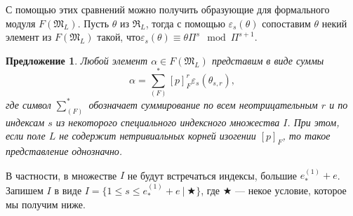 \documentclass[a4paper]{article}
\newcommand{\ML}{\mathfrak{M}_L}
\newcommand{\RL}{\mathfrak{R}_L}
\newcommand{\Leq}{\leqslant}
\newtheorem{proposition}{Предложение}
\begin{document}
С помощью этих сравнений можно получить образующие для формального модуля $F(\ML)$. Пусть $\theta$ из $\RL$, тогда с помощью $\varepsilon_s(\theta)$ сопоставим $\theta$ некий элемент из $F(\ML)$ такой, что\linebreak $\varepsilon_s(\theta)\equiv\theta\Pi^s\mod\Pi^{s+1}$.
\begin{proposition}
Любой элемент $\alpha\in F(\ML)$ представим в виде суммы
$$\alpha={\sum}_{(F)}^*[p]_F^r\varepsilon_s(\theta_{s,r}),$$
где символ $\sum_{(F)}^*$ обозначает суммирование по всем неотрицательным $r$ и по индексам $s$ из некоторого специального индексного множества $I$. При этом, если поле $L$ не содержит нетривиальных корней изогении $[p]_F$, то такое представление однозначно.
\end{proposition}
В частности, в множестве $I$ не будут встречаться индексы, большие $e_*^{(1)}+e$. Запишем $I$ в виде $I=\{1\Leq s\Leq e_*^{(1)}+e\ |\ \bigstar\}$, где $\bigstar$ --- некое условие, которое мы получим ниже.
\end{document}
